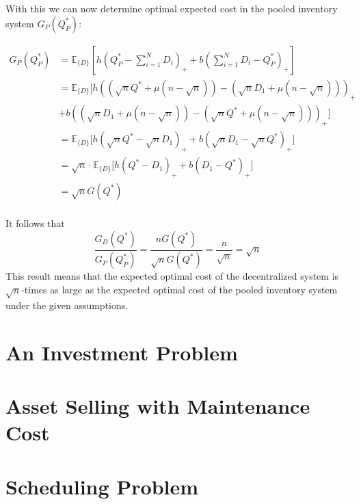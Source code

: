 \documentclass[11pt, oneside]{article}   	%
\begin{document}
With this we can now determine optimal expected cost in the pooled inventory system $G_P(Q_P^*)$:

\begin{align*}
G_P(Q_P^*) &=  \mathbb{E}_{\{D\}}\left[h(Q_P^* - \sum_{i=1}^N D_i)_+ + b(\sum_{i=1}^N D_i - Q_P^*)_+\right]\\
&=  \mathbb{E}_{\{D\}}\big[h((\sqrt{n} Q^* + \mu (n-\sqrt{n})) - (\sqrt{n}D_1 + \mu (n-\sqrt{n})))_+ \\
&+ b((\sqrt{n}D_1 + \mu (n-\sqrt{n})) - (\sqrt{n} Q^* + \mu (n-\sqrt{n})))_+\big]\\
&=  \mathbb{E}_{\{D\}}\big[h(\sqrt{n} Q^* - \sqrt{n}D_1)_+ + b(\sqrt{n}D_1 - \sqrt{n} Q^* )_+\big]\\
&=  \sqrt{n} \cdot \mathbb{E}_{\{D\}}\big[h( Q^* - D_1)_+ + b(D_1 -  Q^* )_+\big]\\
&=  \sqrt{n} G(Q^*)\\
\end{align*}

It follows that
$$
\frac{G_D(Q^*)}{G_P(Q_P^*)} = \frac{n G(Q^*)}{\sqrt{n} G(Q^*)} = \frac{n}{\sqrt{n}} = \sqrt{n} 
$$
This result means that the expected optimal cost of the decentralized system is $\sqrt{n}$-times as large as the expected optimal cost of the pooled inventory system under the given assumptions.


\section{An Investment Problem}


\section{Asset Selling with Maintenance Cost}


\section{Scheduling Problem}
\end{document}
